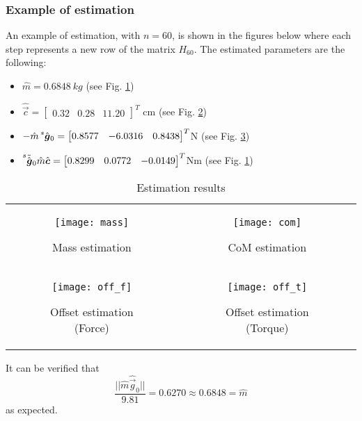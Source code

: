 \subsubsection{Example of estimation}
An example of estimation, with $n=60$, is shown in the figures below where each step represents a new row of the
matrix $H_{60}$. The estimated parameters are the following:
\begin{itemize}
\item $\hat{m} = \SI{0.6848}{kg}$ (see Fig. \ref{fig:mass_estimation})
\item $\hat{\vec{c}} =
  \begin{bmatrix}
    0.32 & 0.28 & 11.20
  \end{bmatrix}^T$ cm  (see Fig. \ref{fig:com_estimation})
\item $-\hat{m} \prescript{s}{}{ \hat{\vec{g}}}_{0} =
  \begin{bmatrix}
    0.8577 & -6.0316 & 0.8438 
  \end{bmatrix}^T
  $N  (see Fig. \ref{fig:off_f_estimation})
\item $\prescript{s}{}{ \tilde{\hat{\vec{g}}}}_{0} \hat{m}\hat{\vec{c}} =
  \begin{bmatrix}
    0.8299 & 0.0772 & -0.0149  
  \end{bmatrix}^T
  $Nm  (see Fig. \ref{fig:off_t_estimation})
\end{itemize}
\begin{table}[h]
  \begin{tabular}{cc}
    \begin{subfigure}{0.5\textwidth}
      \centering
      \texttt{[image: mass]}
      \caption{Mass estimation \label{fig:mass_estimation}}
    \end{subfigure}&
    \begin{subfigure}{0.5\textwidth}
      \centering
      \texttt{[image: com]}
      \caption{CoM estimation\label{fig:com_estimation}}
    \end{subfigure} \\
    \begin{subfigure}{0.5\textwidth}
      \centering
      \texttt{[image: off\_f]}
      \caption{Offset estimation (Force) \label{fig:off_f_estimation}}
    \end{subfigure}&
    \begin{subfigure}{0.5\textwidth}
      \centering
      \texttt{[image: off\_t]}
      \caption{Offset estimation (Torque) \label{fig:off_t_estimation}}
    \end{subfigure}
  \end{tabular}
  \caption{Estimation results}
\end{table}
It can be verified that
\[
\frac{||\hat{m}\hat{\vec{g}}_0||}{9.81} = 0.6270 \approx 0.6848 = \hat{m}
\]
as expected.
\newpage
